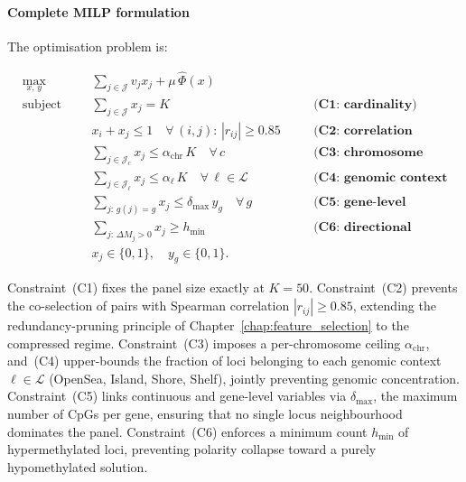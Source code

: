 \paragraph{Complete MILP formulation}

The optimisation problem is:

\begin{equation}
\label{eq:knapsack}
\begin{alignedat}{3}
&\underset{x,\,y}{\text{max}} \quad
  &&\sum_{j \in \mathcal{J}} v_j x_j
   + \mu\,\hat{\Phi}(x) \\[6pt]
&\text{subject to}
  &&\sum_{j \in \mathcal{J}} x_j = K
     & \quad &\textbf{(C1: cardinality)}\\[3pt]
  &&&x_i + x_j \le 1
     \quad \forall\,(i,j):\,|r_{ij}| \ge 0.85
     & &\textbf{(C2: correlation exclusion)}\\[3pt]
  &&&\sum_{j \in \mathcal{J}_c} x_j \le \alpha_{\mathrm{chr}}\,K
     \quad \forall\, c
     & &\textbf{(C3: chromosome caps)}\\[3pt]
  &&&\sum_{j \in \mathcal{J}_\ell} x_j \le \alpha_\ell\,K
     \quad \forall\,\ell \in \mathcal{L}
     & &\textbf{(C4: genomic context limits)}\\[3pt]
  &&&\sum_{j:\,g(j)=g} x_j \le \delta_{\max}\,y_g
     \quad \forall\, g
     & &\textbf{(C5: gene-level diversity)}\\[3pt]
  &&&\sum_{j:\,\Delta M_j > 0} x_j \ge h_{\min}
     & &\textbf{(C6: directional balance)}\\[3pt]
  &&&x_j \in \{0,1\},\quad y_g \in \{0,1\}.
\end{alignedat}
\end{equation}

Constraint~(C1) fixes the panel size exactly at $K = 50$.
Constraint~(C2) prevents the co-selection of pairs with
Spearman correlation $|r_{ij}| \ge 0.85$, extending the
redundancy-pruning principle of Chapter~\ref{chap:feature_selection}
to the compressed regime. Constraint~(C3) imposes a per-chromosome
ceiling $\alpha_{\mathrm{chr}}$, and~(C4) upper-bounds the
fraction of loci belonging to each genomic context
$\ell \in \mathcal{L}$ (OpenSea, Island, Shore, Shelf),
jointly preventing genomic concentration.
Constraint~(C5) links continuous and gene-level variables via
$\delta_{\max}$, the maximum number of CpGs per gene, ensuring
that no single locus neighbourhood dominates the panel.
Constraint~(C6) enforces a minimum count $h_{\min}$ of
hypermethylated loci, preventing polarity collapse toward a
purely hypomethylated solution.

